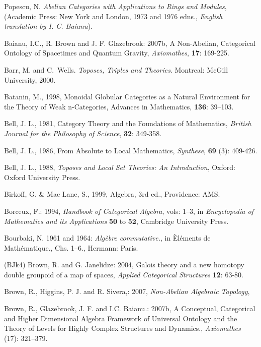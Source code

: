\documentclass[12pt]{article}
\theoremstyle{plain}
\theoremstyle{definition}
\numberwithin{equation}{section}
\begin{document}
\begin{thebibliography}{9}

Popescu, N. {\em Abelian Categories with Applications to Rings and Modules},
(Academic Press: New York and London, 1973 and 1976 edns., {\em English translation by I. C. Baianu}).

Baianu, I.C.,  R. Brown and J. F. Glazebrook: 2007b, A Non-Abelian, Categorical Ontology of Spacetimes and Quantum Gravity, {\em Axiomathes}, \textbf{17}: 169-225.

Barr, M. and C.~Wells. {\em Toposes, Triples and Theories}. Montreal: McGill University, 2000.
 
Batanin, M., 1998, Monoidal Globular Categories as a Natural Environment for the Theory of Weak n-Categories, Advances in Mathematics, \textbf{136}: 39--103.   

Bell, J. L., 1981, Category Theory and the Foundations of Mathematics, {\em British Journal for the Philosophy of Science}, \textbf{32}: 349-358. 
 
Bell, J. L., 1986, From Absolute to Local Mathematics, {\em Synthese}, \textbf{69} (3): 409-426. 

Bell, J. L., 1988, {\em Toposes and Local Set Theories: An Introduction}, Oxford: Oxford University Press. 

Birkoff, G. \& Mac Lane, S., 1999, Algebra, 3rd ed., Providence: AMS.   


Borceux, F.: 1994, \emph{Handbook of Categorical Algebra}, vols: 1--3, 
in {\em Encyclopedia of Mathematics and its Applications} \textbf{50} to \textbf{52}, Cambridge University Press.

Bourbaki, N. 1961 and 1964: \emph{Alg\`{e}bre commutative.},
in \`{E}l\'{e}ments de Math\'{e}matique., Chs. 1--6., Hermann: Paris.

\bibitem (BJk4)
Brown, R. and G. Janelidze: 2004, Galois theory and a new homotopy double groupoid of a map of spaces, 
\emph{Applied Categorical Structures} \textbf{12}: 63-80.

Brown, R., Higgins, P. J. and R. Sivera,: 2007, \emph{Non-Abelian Algebraic Topology}, 

Brown, R., Glazebrook, J. F. and I.C. Baianu.: 2007b, A Conceptual, Categorical and Higher Dimensional Algebra Framework of Universal Ontology and the Theory of Levels for Highly Complex Structures and Dynamics., \emph{Axiomathes} (17): 321--379.


\end{thebibliography}
\end{document}

